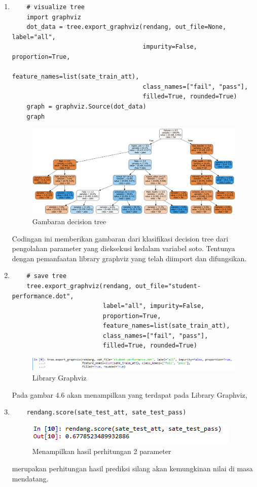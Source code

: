 \begin{enumerate}
\item
\begin{verbatim}
	# visualize tree
	import graphviz
	dot_data = tree.export_graphviz(rendang, out_file=None, label="all", 
									impurity=False, proportion=True,
	                                feature_names=list(sate_train_att), 
									class_names=["fail", "pass"], 
	                                filled=True, rounded=True)
	graph = graphviz.Source(dot_data)
	graph
\end{verbatim}
\begin{figure}[ht]
\centering
\includegraphics[scale=0.3]{figures/45.png}
\caption{Gambaran decision tree}
\end{figure}
\par
	Codingan ini memberikan gambaran dari klasifikasi decision tree dari pengolahan parameter yang dieksekusi kedalam variabel soto. Tentunya dengan pemanfaatan library graphviz yang telah diimport dan difungsikan.

\item
\begin{verbatim}
	# save tree
	tree.export_graphviz(rendang, out_file="student-performance.dot", 
						 label="all", impurity=False, 
						 proportion=True,
	                     feature_names=list(sate_train_att), 
	                     class_names=["fail", "pass"], 
	                     filled=True, rounded=True)
\end{verbatim}
\begin{figure}[ht]
\centering
\includegraphics[scale=0.6]{figures/46.png}
\caption{Library Graphviz}
\end{figure}
\par
	Pada gambar 4.6 akan menampilkan yang terdapat pada Library Graphviz,
\item
\begin{verbatim}
	rendang.score(sate_test_att, sate_test_pass)
\end{verbatim}
\begin{figure}[ht]
\centering
\includegraphics[scale=0.9]{figures/47.png}
\caption{Menampilkan hasil perhitungan 2 parameter}
\end{figure}
\par
	merupakan perhitungan hasil prediksi silang akan kemungkinan nilai di masa mendatang.


\end{enumerate}
